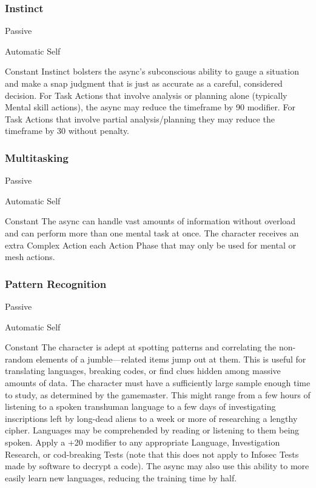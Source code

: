\subsubsection{Instinct}


  

Passive

   Automatic
 Self

   Constant
Instinct bolsters the async's subconscious ability to 
gauge a situation and make a snap judgment that 
is just as accurate as a careful, considered decision. 
For Task Actions that involve analysis or planning 
alone (typically Mental skill actions), the async may 
reduce the timeframe by 90%
modifier. For Task Actions that involve partial analysis/planning
they may reduce the timeframe by 30%
without penalty.

\subsubsection{Multitasking}


  

Passive

   Automatic
 Self

   Constant
The async can handle vast amounts of information 
without overload and can perform more than one 
mental task at once. The character receives an extra 
Complex Action each Action Phase that may only be 
used for mental or mesh actions.

\subsubsection{Pattern Recognition}


  

Passive

   Automatic
 Self

   Constant
The character is adept at spotting patterns and correlating
the non-random elements of a jumble—related
items jump out at them. This is useful for translating 
languages, breaking codes, or find clues hidden among 
massive amounts of data. The character must have 
a sufficiently large sample enough time to study, as 
determined by the gamemaster. This might range from 
a few hours of listening to a spoken transhuman language
to a few days of investigating inscriptions left
by long-dead aliens to a week or more of researching 
a lengthy cipher. Languages may be comprehended by 
reading or listening to them being spoken. Apply a 
+20 modifier to any appropriate Language, Investigation
Research, or cod-breaking Tests (note that this
does not apply to Infosec Tests made by software to 
decrypt a code). The async may also use this ability to 
more easily learn new languages, reducing the training 
time by half.

